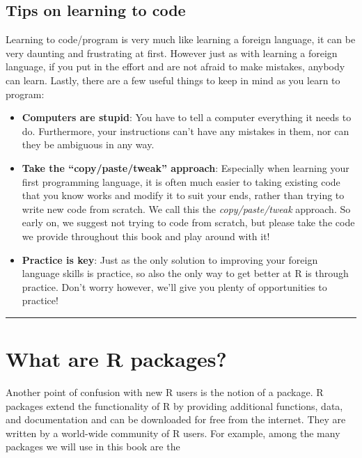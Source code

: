 \documentclass[12pt,]{krantz}
\providecommand{\tightlist}{%
  \setlength{\itemsep}{0pt}\setlength{\parskip}{0pt}}
\theoremstyle{definition}
\theoremstyle{definition}
\theoremstyle{definition}
\theoremstyle{remark}
\begin{document}
\subsection{Tips on learning to code}\label{tips-on-learning-to-code}

Learning to code/program is very much like learning a foreign language,
it can be very daunting and frustrating at first. However just as with
learning a foreign language, if you put in the effort and are not afraid
to make mistakes, anybody can learn. Lastly, there are a few useful
things to keep in mind as you learn to program:

\begin{itemize}
\tightlist
\item
  \textbf{Computers are stupid}: You have to tell a computer everything
  it needs to do. Furthermore, your instructions can't have any mistakes
  in them, nor can they be ambiguous in any way.
\item
  \textbf{Take the ``copy/paste/tweak'' approach}: Especially when
  learning your first programming language, it is often much easier to
  taking existing code that you know works and modify it to suit your
  ends, rather than trying to write new code from scratch. We call this
  the \emph{copy/paste/tweak} approach. So early on, we suggest not
  trying to code from scratch, but please take the code we provide
  throughout this book and play around with it!
\item
  \textbf{Practice is key}: Just as the only solution to improving your
  foreign language skills is practice, so also the only way to get
  better at R is through practice. Don't worry however, we'll give you
  plenty of opportunities to practice!
\end{itemize}

\begin{center}\rule{0.5\linewidth}{\linethickness}\end{center}

\section{What are R packages?}\label{packages}

Another point of confusion with new R users is the notion of a package.
R packages extend the functionality of R by providing additional
functions, data, and documentation and can be downloaded for free from
the internet. They are written by a world-wide community of R users. For
example, among the many packages we will use in this book are the
\end{document}
